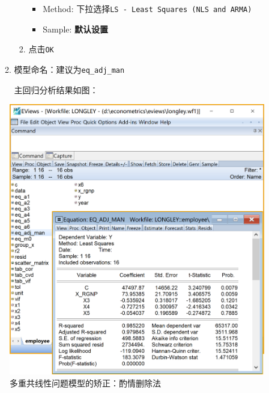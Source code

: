 \documentclass[12pt,(landscape,a4paper),(portrait,a4paper)]{article}
\providecommand{\tightlist}{%
  \setlength{\itemsep}{0pt}\setlength{\parskip}{0pt}}
\begin{document}
\begin{itemize}
\begin{enumerate}
\begin{enumerate}
      \begin{itemize}
      \tightlist
      \item
        Method: 下拉选择\texttt{LS\ -\ Least\ Squares\ (NLS\ and\ ARMA)}
      \item
        Sample: \textbf{默认设置}
      \end{itemize}
    \item
      点击\texttt{OK}\\
    \end{enumerate}
  \item
    模型命名：建议为\texttt{eq\_adj\_man}

    主回归分析结果如图：
  \end{enumerate}
\end{itemize}

\begin{figure}

{\centering \includegraphics[width=8in]{picture/lab5-multilinearity/5-model-adj-man} 

}

\caption{多重共线性问题模型的矫正：酌情删除法}\label{fig:fig-adj-man}
\end{figure}
\end{document}
